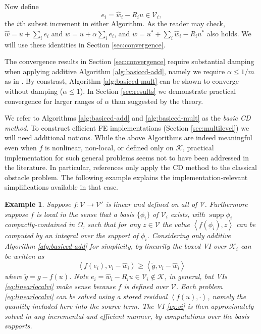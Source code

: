 \documentclass[letterpaper,final,12pt,reqno]{amsart}
\theoremstyle{cstyle}
\theoremstyle{cstyle*}
\theoremstyle{dstyle}
\newtheorem{example}[theorem]{Example}
\numberwithin{equation}{section}
\numberwithin{figure}{section}
\numberwithin{table}{section}
\numberwithin{theorem}{section}
\newcommand{\cK}{\mathcal{K}}
\newcommand{\cV}{\mathcal{V}}
\newcommand{\ip}[2]{\left<#1,#2\right>}
\newcommand{\supp}{\operatorname{supp}}
\begin{document}
Now define
\begin{equation}
e_i = \hat w_i - R_i u \in \cV_i, \label{eq:ithupdate}
\end{equation}
the $i$th subset increment in either Algorithm.  As the reader may check, $\hat w = u + \sum_{i} e_i$ and $w = u + \alpha \sum_i e_i$, and $\hat w = u^* + \sum_i \hat w_i - R_i u^*$ also holds.  We will use these identities in Section \ref{sec:convergence}.

The convergence results in Section \ref{sec:convergence} require substantial damping when applying additive Algorithm \ref{alg:basiccd-add}, namely we require $\alpha \le 1/m$ as in \cite{Tai2003}.  By constrast, Algorithm \ref{alg:basiccd-mult} can be shown to converge without damping ($\alpha\le 1$).  In Section \ref{sec:results} we demonstrate practical convergence for larger ranges of $\alpha$ than suggested by the theory.

We refer to Algorithms \ref{alg:basiccd-add} and \ref{alg:basiccd-mult} as the \emph{basic CD method}.  To construct efficient FE implementations (Section \ref{sec:multilevel}) we will need additional notions.  While the above Algorithms are indeed meaningful even when $f$ is nonlinear, non-local, or defined only on $\cK$, practical implementation for such general problems seems not to have been addressed in the literature.  In particular, references \cite{GraeserKornhuber2009,Tai2003} only apply the CD method to the classical obstacle problem.  The following example explains the implementation-relevant simplifications available in that case.

\begin{example}  \label{ex:fnice} Suppose $f:\cV \to \cV'$ is linear and defined on all of $\cV$.  Furthermore suppose $f$ is local in the sense that a basis $\{\phi_i\}$ of $\cV_i$ exists, with $\supp \phi_i$ compactly-contained in $\Omega$, such that for any $z\in\mathcal{V}$ the value $\ip{f(\phi_i)}{z}$ can be computed by an integral over the support of $\phi_i$.  Considering only additive Algorithm \ref{alg:basiccd-add} for simplicity, by linearity the boxed VI over $\cK_i$ can be written as
\begin{equation}
\ip{f(e_i)}{v_i-\hat w_i} \ge \ip{\tilde g}{v_i-\hat w_i} \label{eq:linearlocalvi}
\end{equation}
where $\tilde g = g - f(u)$.  Note $e_i = \hat w_i - R_i u \in \cV_i \notin \cK$, in general, but VIs \eqref{eq:linearlocalvi} make sense because $f$ is defined over $\cV$.  Each problem \eqref{eq:linearlocalvi} can be solved using a stored residual $\ip{f(u)}{\cdot}$, namely the quantity included here into the source term.  The VI \eqref{eq:vi} is then approximately solved in any incremental and efficient manner, by computations over the basis supports.
\end{example}
\end{document}
